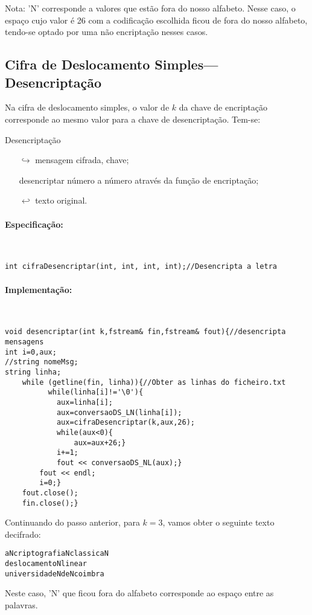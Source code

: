 Nota: 'N' corresponde a valores que estão fora do nosso alfabeto. Nesse caso, o espaço cujo valor é 26 com a codificação escolhida ficou de fora do nosso alfabeto, tendo-se optado por uma não encriptação nesses casos.

\subsection{Cifra de Deslocamento Simples---Desencriptação}
\label{sec:CifraDeslocamentoSimplesdesencriptação}
Na cifra de deslocamento simples, o valor de $k$ da chave de encriptação corresponde ao mesmo valor para a chave de desencriptação. Tem-se:

Desencriptação
\begin{itemize}
    \item[$\hookrightarrow$]  mensagem cifrada, chave;
    \item[] desencriptar número a número através da função de encriptação;
    \item[$\hookleftarrow$]  texto original.
\end{itemize}

\paragraph{Especificação:} {\ }

\begin{lstlisting}[frame=single,mathescape=true,caption={Cifra de Deslocamento Simples---Especificação de \texttt{cifraDesencriptar}},captionpos=b,label={lst:DeslocamentoSimplesDesencriptar},basicstyle=\footnotesize]
int cifraDesencriptar(int, int, int, int);//Desencripta a letra
\end{lstlisting}

\paragraph{Implementação:} {\ }
\begin{lstlisting}[frame=single,mathescape=true,caption={Desencriptar},captionpos=b,label={lst:Desencriptar},basicstyle=\footnotesize]
void desencriptar(int k,fstream& fin,fstream& fout){//desencripta mensagens
int i=0,aux;
//string nomeMsg;
string linha;
    while (getline(fin, linha)){//Obter as linhas do ficheiro.txt
          while(linha[i]!='\0'){
            aux=linha[i];
            aux=conversaoDS_LN(linha[i]);
            aux=cifraDesencriptar(k,aux,26);
            while(aux<0){
                aux=aux+26;}
            i+=1;
            fout << conversaoDS_NL(aux);}
        fout << endl;
        i=0;}
    fout.close();
    fin.close();}
\end{lstlisting}
Continuando do passo anterior, para $k=3$, vamos obter o seguinte texto decifrado:
\begin{verbatim}
aNcriptografiaNclassicaN
deslocamentoNlinear
universidadeNdeNcoimbra
\end{verbatim}
Neste caso, 'N' que ficou fora do alfabeto corresponde ao espaço entre as palavras.


